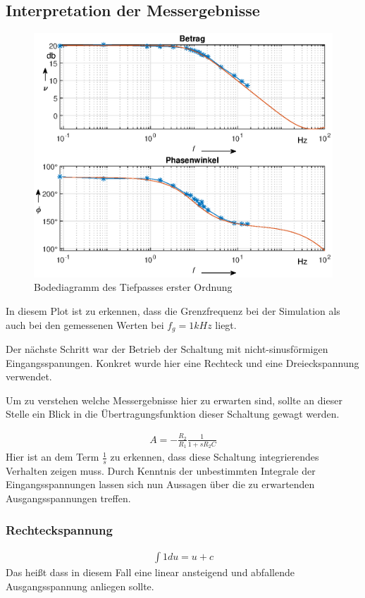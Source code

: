 \subsection{Interpretation der Messergebnisse}
\begin{figure}[H]
    \centering
    \includegraphics[width=\textwidth]{Lab_2/Plots/TP_first_order.eps}
    \caption{Bodediagramm des Tiefpasses erster Ordnung}
    \label{fig:Bode_aktiver_Tiefpass}
\end{figure}
In diesem Plot ist zu erkennen, dass die Grenzfrequenz bei der Simulation als auch bei den gemessenen Werten bei $f_g = 1kHz$ liegt. 

Der nächste Schritt war der Betrieb der Schaltung mit nicht-sinusförmigen Eingangsspanungen. Konkret wurde hier eine Rechteck und eine Dreieckspannung verwendet.

Um zu verstehen welche Messergebnisse hier zu erwarten sind, sollte an dieser Stelle ein Blick in die Übertragungsfunktion dieser Schaltung gewagt werden.

\begin{align}
    A = -\frac{R_2}{R_1}\frac{1}{1+sR_2 C}
\end{align}
Hier ist an dem Term $\frac{1}{s} $ zu erkennen, dass diese Schaltung integrierendes Verhalten zeigen muss. Durch Kenntnis der unbestimmten Integrale der Eingangsspannungen lassen sich nun Aussagen über die zu erwartenden Ausgangsspannungen treffen.
\subsubsection{Rechteckspannung}
\begin{align}
    \int{1 du} = u + c
\end{align}
Das heißt dass in diesem Fall eine linear ansteigend und abfallende Ausgangsspannung anliegen sollte.

